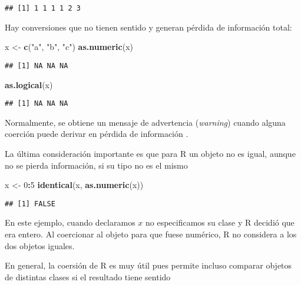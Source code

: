 \documentclass[]{article}
\newenvironment{Shaded}{\begin{snugshade}}{\end{snugshade}}
\newcommand{\KeywordTok}[1]{\textcolor[rgb]{0.13,0.29,0.53}{\textbf{#1}}}
\newcommand{\DecValTok}[1]{\textcolor[rgb]{0.00,0.00,0.81}{#1}}
\newcommand{\StringTok}[1]{\textcolor[rgb]{0.31,0.60,0.02}{#1}}
\newcommand{\OperatorTok}[1]{\textcolor[rgb]{0.81,0.36,0.00}{\textbf{#1}}}
\newcommand{\NormalTok}[1]{#1}
\begin{document}
\begin{verbatim}
## [1] 1 1 1 1 2 3
\end{verbatim}

Hay conversiones que no tienen sentido y generan pérdida de información
total:

\begin{Shaded}
\begin{Highlighting}[]
\NormalTok{x <-}\StringTok{ }\KeywordTok{c}\NormalTok{(}\StringTok{"a"}\NormalTok{, }\StringTok{"b"}\NormalTok{, }\StringTok{"c"}\NormalTok{)}
\KeywordTok{as.numeric}\NormalTok{(x)}
\end{Highlighting}
\end{Shaded}

\begin{verbatim}
## [1] NA NA NA
\end{verbatim}

\begin{Shaded}
\begin{Highlighting}[]
\KeywordTok{as.logical}\NormalTok{(x)}
\end{Highlighting}
\end{Shaded}

\begin{verbatim}
## [1] NA NA NA
\end{verbatim}

Normalmente, se obtiene un mensaje de advertencia (\emph{warning})
cuando alguna coerción puede derivar en pérdida de información
\parencite{wickham2014advanced}.

La última consideración importante es que para R un objeto no es igual,
aunque no se pierda información, si su tipo no es el mismo

\begin{Shaded}
\begin{Highlighting}[]
\NormalTok{x <-}\StringTok{ }\DecValTok{0}\OperatorTok{:}\DecValTok{5}
\KeywordTok{identical}\NormalTok{(x, }\KeywordTok{as.numeric}\NormalTok{(x))}
\end{Highlighting}
\end{Shaded}

\begin{verbatim}
## [1] FALSE
\end{verbatim}

En este ejemplo, cuando declaramos \(x\) no especificamos su clase y R
decidió que era entero. Al coercionar al objeto para que fuese numérico,
R no considera a los dos objetos iguales.

En general, la coersión de R es muy útil pues permite incluso comparar
objetos de distintas clases si el resultado tiene sentido
\end{document}

